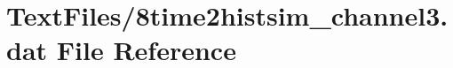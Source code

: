 \hypertarget{8time2histsim__channel3_8dat}{}\section{Text\+Files/8time2histsim\+\_\+channel3.dat File Reference}
\label{8time2histsim__channel3_8dat}
